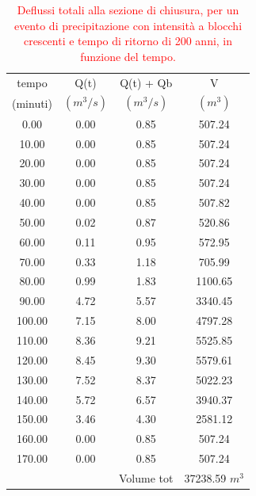 \begin{table}[H] \centering
    \caption{\textcolor{red}{Deflussi totali alla sezione di chiusura, per un evento di precipitazione con intensità a blocchi crescenti e tempo di ritorno di 200 anni, in funzione del tempo.}}
        \begin{tabular}{cccc}
        \toprule
        tempo    & Q(t)   & Q(t) + Qb  & V        \\
        (minuti) & $(m^3/s)$ & $(m^3/s)$     & $(m^3)$     \\
        \midrule
        0.00     & 0.00   & 0.85       & 507.24   \\
        10.00    & 0.00   & 0.85       & 507.24   \\
        20.00    & 0.00   & 0.85       & 507.24   \\
        30.00    & 0.00   & 0.85       & 507.24   \\
        40.00    & 0.00   & 0.85       & 507.82   \\
        50.00    & 0.02   & 0.87       & 520.86   \\
        60.00    & 0.11   & 0.95       & 572.95   \\
        70.00    & 0.33   & 1.18       & 705.99   \\
        80.00    & 0.99   & 1.83       & 1100.65  \\
        90.00    & 4.72   & 5.57       & 3340.45  \\
        100.00   & 7.15   & 8.00       & 4797.28  \\
        110.00   & 8.36   & 9.21       & 5525.85  \\
        120.00   & 8.45   & 9.30       & 5579.61  \\
        130.00   & 7.52   & 8.37       & 5022.23  \\
        140.00   & 5.72   & 6.57       & 3940.37  \\
        150.00   & 3.46   & 4.30       & 2581.12  \\
        160.00   & 0.00   & 0.85       & 507.24   \\
        170.00   & 0.00   & 0.85       & 507.24   \\
                 &        & Volume tot & 37238.59 $m^3$\\
        \bottomrule
        \end{tabular}
        \end{table}

